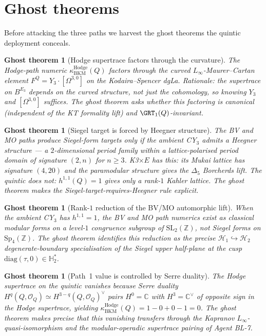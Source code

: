 \documentclass[11pt]{amsart}
\newtheorem{ghost}[theorem]{Ghost theorem}
\providecommand{\C}{\mathbb{C}}
\providecommand{\Z}{\mathbb{Z}}
\providecommand{\Q}{\mathbb{Q}}
\providecommand{\cO}{\mathcal{O}}
\providecommand{\Sp}{\mathrm{Sp}}
\providecommand{\SL}{\mathrm{SL}}
\providecommand{\kBKM}{\kappa_{\mathrm{BKM}}}
\providecommand{\Hdg}{\mathrm{Hodge}}
\begin{document}
\section{Ghost theorems}
\label{sec:ghosts-quintic}

Before attacking the three paths we harvest the ghost theorems the
quintic deployment conceals.

\begin{ghost}[Hodge supertrace factors through the curvature]
\label{ghost:hodge-factors-curvature}
The Hodge-path numeric $\kBKM^{\Hdg}(Q)$ factors through the curved
$L_\infty$-Maurer--Cartan element $F^Q = Y_3 \cdot [\Omega^{3,0}]$
on the Kodaira--Spencer dgLa. Rationale: the supertrace on
$B^{E_3}$ depends on the curved structure, not just the cohomology,
so knowing $Y_3$ and $[\Omega^{3,0}]$ suffices. The ghost theorem
asks whether this factoring is canonical (independent of the KT
formality lift) and $\GRT_1(\Q)$-invariant.
\end{ghost}

\begin{ghost}[Siegel target is forced by Heegner structure]
\label{ghost:siegel-heegner}
The BV and MO paths produce Siegel-form targets \emph{only if}
the ambient CY$_3$ admits a Heegner structure --- a $2$-dimensional
period family within a lattice-polarised period domain of
signature $(2, n)$ for $n \geq 3$. K3$\times E$ has this: its
Mukai lattice has signature $(4, 20)$ and the paramodular
structure gives the $\Delta_5$ Borcherds lift. The quintic does
not: $h^{1,1}(Q) = 1$ gives only a rank-$1$ Kahler lattice.
The ghost theorem makes the Siegel-target-requires-Heegner
rule explicit.
\end{ghost}

\begin{ghost}[Rank-$1$ reduction of the BV/MO automorphic lift]
\label{ghost:rank-1-reduction}
When the ambient CY$_3$ has $h^{1,1} = 1$, the BV and MO path
numerics exist as classical modular forms on a level-$1$
congruence subgroup of $\SL_2(\Z)$, not Siegel forms on
$\Sp_4(\Z)$. The ghost theorem identifies this reduction as the
precise $\mathcal{H}_1 \hookrightarrow \mathcal{H}_2$
degenerate-boundary specialisation of the Siegel upper half-plane
at the cusp $\mathrm{diag}(\tau, 0) \in \mathbb{H}_2^*$.
\end{ghost}

\begin{ghost}[Path~1 value is controlled by Serre duality]
\label{ghost:path-1-serre}
The Hodge supertrace on the quintic vanishes because Serre
duality $H^q(Q, \cO_Q) \simeq H^{3-q}(Q, \cO_Q)^\vee$ pairs
$H^0 = \C$ with $H^3 = \C^\vee$ of opposite sign in the Hodge
supertrace, yielding $\kBKM^{\Hdg}(Q) = 1 - 0 + 0 - 1 = 0$.
The ghost theorem makes precise that this vanishing transfers
through the Kapranov $L_\infty$-quasi-isomorphism and the
modular-operadic supertrace pairing of Agent BL-7.
\end{ghost}
\end{document}
